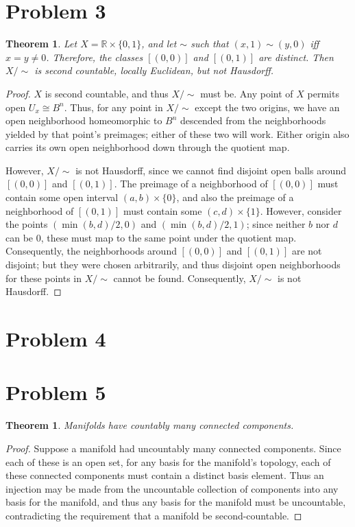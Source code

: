\documentclass{article}
\newtheorem{theorem}[subsection]{Theorem}
\theoremstyle{definition}
\newcommand{\R}{\mathbb{R}}
\begin{document}
\section{Problem 3}
\begin{theorem}
Let $X=\R \times \{0,1\}$, and let $\sim$ such that $(x,1) \sim (y,0)$ iff 
$x=y \neq 0$. Therefore, the classes $[(0,0)]$ and $[(0,1)]$ are distinct.
Then $X / \sim$ is second countable, locally Euclidean, but not Hausdorff.
\end{theorem}
\begin{proof}
$X$ is second countable, and thus $X / \sim$ must be. Any point of $X$ 
permits open $U_x \cong B^n$. Thus, for any point in $X/ \sim$ except
the two origins, we have an open neighborhood homeomorphic to $B^n$ 
descended from the neighborhoods yielded by that point's preimages;
either of these two will work. Either origin also carries its own open
neighborhood down through the quotient map.

However, $X / \sim$ is not Hausdorff, since we cannot find disjoint 
open balls around $[(0,0)]$ and $[(0,1)]$. The preimage of a neighborhood
of $[(0,0)]$ must contain some open interval $(a,b) \times \{0\}$,
and also the preimage of a neighborhood of $[(0,1)]$ must contain
some $(c,d) \times \{1\}$. However, consider the points 
$(\min(b,d)/2,0)$ and $(\min(b,d)/2,1)$; since neither $b$ nor $d$ can
be $0$, these must map to the same point under the quotient map. 
Consequently, the neighborhoods around $[(0,0)]$ and $[(0,1)]$ are
not disjoint; but they were chosen arbitrarily, and thus disjoint
open neighborhoods for these points in $X / \sim$ cannot be found.
Consequently, $X / \sim$ is not Hausdorff.
\end{proof}
\section{Problem 4}
\section{Problem 5}
\begin{theorem}
Manifolds have countably many connected components.
\end{theorem}
\begin{proof}
Suppose a manifold had uncountably many connected components. Since each
of these is an open set, for any basis for the manifold's topology, 
each of these connected components must contain a distinct basis
element. Thus an injection may be made from the uncountable collection
of components into any basis for the manifold, and thus any basis
for the manifold must be uncountable, contradicting the requirement
that a manifold be second-countable.
\end{proof}
\end{document}
